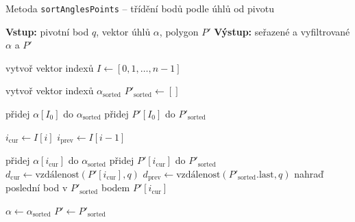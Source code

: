 \begin{algorithm}
    \caption{Metoda \texttt{sortAnglesPoints} -- třídění bodů podle úhlů od pivotu}
    \begin{algorithmic}[1]
        \STATE \textbf{Vstup:} pivotní bod $q$, vektor úhlů $\alpha$, polygon $P'$
        \STATE \textbf{Výstup:} seřazené a vyfiltrované $\alpha$ a $P'$

        \STATE vytvoř vektor indexů $I \gets [0, 1, \dots, n-1]$

        \STATE vytvoř vektor indexů $\alpha_{\text{sorted}}$
        \STATE $P'_{\text{sorted}} \gets []$

            \STATE přidej $\alpha[I_0]$ do $\alpha_{\text{sorted}}$
            \STATE přidej $P'[I_0]$ do $P'_{\text{sorted}}$

                \STATE $i_{\text{cur}} \gets I[i]$
                \STATE $i_{\text{prev}} \gets I[i - 1]$

                    \STATE přidej $\alpha[i_{\text{cur}}]$ do $\alpha_{\text{sorted}}$
                    \STATE přidej $P'[i_{\text{cur}}]$ do $P'_{\text{sorted}}$
                \ELSE
                    \STATE $d_{\text{cur}} \gets \text{vzdálenost}(P'[i_{\text{cur}}], q)$
                    \STATE $d_{\text{prev}} \gets \text{vzdálenost}(P'_{\text{sorted}}.\text{last}, q)$
                        \STATE nahraď poslední bod v $P'_{\text{sorted}}$ bodem $P'[i_{\text{cur}}]$
                    \ENDIF
                \ENDIF
            \ENDFOR
        \ENDIF

        \STATE $\alpha \gets \alpha_{\text{sorted}}$
        \STATE $P' \gets P'_{\text{sorted}}$
    \end{algorithmic}
\end{algorithm}
